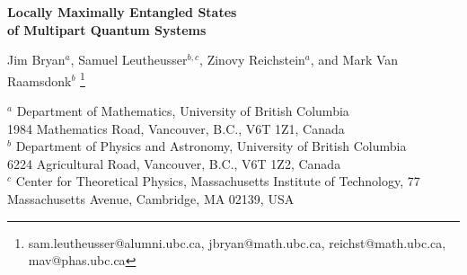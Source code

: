 \documentclass[12pt]{article}
\theoremstyle{definition}
\begin{document}
\begin{titlepage}
\hfill
\vbox{
      }  %
\vspace*{20mm}
\begin{center}
{\Large \bf Locally Maximally Entangled States \\ of Multipart Quantum Systems}

\vspace*{15mm}
\vspace*{1mm}
 Jim Bryan$^a$, Samuel Leutheusser$^{b,c}$, Zinovy Reichstein$^a$, and Mark Van Raamsdonk$^b$
\vspace*{1cm}
\let\thefootnote\relax\footnote{sam.leutheusser@alumni.ubc.ca, jbryan@math.ubc.ca, reichst@math.ubc.ca, mav@phas.ubc.ca}

{${}^{a}$ Department of Mathematics,
University of British Columbia\\
1984 Mathematics Road,
Vancouver, B.C., V6T 1Z1, Canada\\
${}^{b}$ Department of Physics and Astronomy,
University of British Columbia\\
6224 Agricultural Road,
Vancouver, B.C., V6T 1Z2, Canada \\
${}^{c}$
Center for Theoretical Physics, 
Massachusetts Institute of Technology,
77 Massachusetts Avenue,
Cambridge, MA 02139, USA
}

\end{center}
\begin{abstract}

For a multipart quantum system, a locally maximally entangled (LME)
state is one where each elementary subsystem is maximally entangled
with its complement. This paper is a sequel to~arXiv:1708.01645, which gives necessary and sufficient conditions for a system to admit LME states in terms of its subsystem dimensions $(d_1, d_2, \dots, d_n)$, and computes the dimension of the space ${\cal H}_{LME}/K$ of LME states up to local unitary transformations for all non-empty cases. In this paper, we provide a pedagogical overview and physical interpretation of the the underlying mathematics that leads to these results and give a large class of explicit constructions for LME states. In particular, we construct all LME states for tripartite systems with subsystem dimensions $(2,A,B)$ and give a general representation-theoretic construction for a special class of stabilizer LME states. The latter construction 
provides a common framework for many known LME states. Our results also give the dimension of the space of SLOCC equivalence classes for states with ``generic'' entanglement for all multipart systems since this space is equivalent to ${\cal H}_{LME}/K$. Finally, we give the dimension of the stabilizer subgroup $S \subset SL(d_1, \mathbb{C}) \times \cdots \times SL(d_n, \mathbb{C})$ for a generic state in an arbitrary multipart system and identify all cases where this stabilizer is trivial.


\end{abstract}
\end{titlepage}
\end{document}
